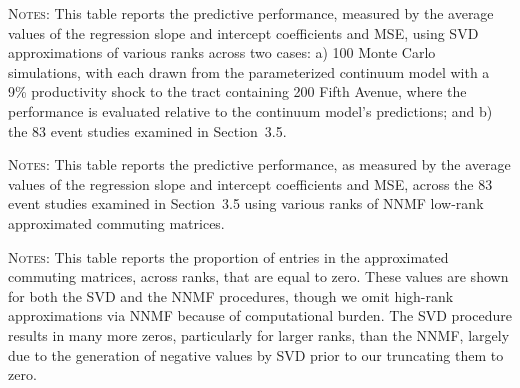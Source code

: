 \documentclass[11pt]{article}
\theoremstyle{definition}
\begin{document}
\begin{table}[h!]
\caption{Summary of SVD Monte Carlo and event study results by rank}
\label{tab:svd:performance}
\vspace{-1.5em}
\begin{center}
\resizebox{\textwidth}{!}{%
}
\begin{minipage}{0.98\textwidth}
{\footnotesize \textsc{Notes}:
This table reports the predictive performance, measured by the average values of the regression slope and intercept coefficients and MSE, using SVD approximations of various ranks across two cases: 
a) 100 Monte Carlo simulations, with each drawn from the parameterized continuum model with a 9\% productivity shock to the tract containing 200 Fifth Avenue, 
where the performance is evaluated relative to the continuum model's predictions; 
and b) the 83 event studies examined in Section~3.5.
\par}\end{minipage}
\end{center}
\vspace{-1.5em}
\end{table}
\begin{table}[h!]
\caption{Summary of NNMF event study results by rank}
\label{tab:nnmf:summary}
\vspace{-1.5em}
\begin{center}

\begin{minipage}{0.98\textwidth}
{\footnotesize \textsc{Notes}:
This table reports the predictive performance, as measured by the average values of the regression slope and intercept coefficients and MSE, across the 83 event studies examined in Section~3.5 using various ranks of NNMF low-rank approximated commuting matrices.
\par}\end{minipage}
\end{center}
\vspace{-1.5em}
\end{table}
\begin{table}[h!]
    \caption{Percentage (\%) of approximated commuting matrix entries equal to zero}
    \label{tab:svd:zeros}
    \vspace{-1.5em}
    \begin{center}
    
    \begin{minipage}{0.98\textwidth}
    {\footnotesize \textsc{Notes}:
    This table reports the proportion of entries in the approximated commuting matrices, across ranks, that are equal to zero. 
    These values are shown for both the SVD and the NNMF procedures, though we omit high-rank approximations via NNMF because of computational burden.
    The SVD procedure results in many more zeros, particularly for larger ranks, than the NNMF, largely due to the generation of negative values by SVD prior to our truncating them to zero.
    \par}\end{minipage}
    \end{center}
    \vspace{-1.5em}
\end{table}
\end{document}
